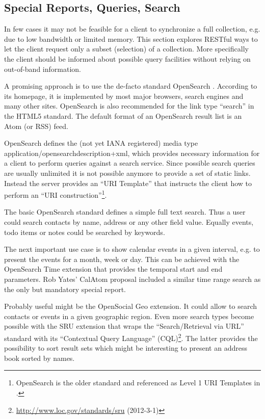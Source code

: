 \documentclass[11pt,a4paper,headsepline,twoside]{scrartcl}		%
\newcommand{\citeurl}[2]{\url{#1} (#2)}
\begin{document}
\subsection{Special Reports, Queries, Search}
\label{sec:spec-reports-search}

In few cases it may not be feasible for a client to synchronize a full
collection, e.g. due to low bandwidth or limited memory. This section explores
RESTful ways to let the client request only a subset (selection) of a
collection. More specifically the client should be informed about possible query
facilities without relying on out-of-band information.

A promising approach is to use the de-facto standard
OpenSearch \cite{Clinton}. According to its homepage, it is implemented by most
major browsers, search engines and many other sites. OpenSearch is also
recommended for the link type ``search'' in the HTML5
standard\cite[sec. 4.12.4.12]{Hickson2011a}. The default format of an OpenSearch
result list is an Atom (or RSS) feed.

OpenSearch defines the (not yet IANA registered) media type
application/opensearchdescription+xml, which provides necessary information for
a client to perform queries against a search service. Since possible search
queries are usually unlimited it is not possible anymore to provide a set of
static links. Instead the server provides an ``URI Template'' \cite{RFC6570}
that instructs the client how to perform an ``URI
construction''\footnote{OpenSearch is the older standard and referenced as Level
  1 URI Templates in \cite{RFC6570}.}.

The basic OpenSearch standard defines a simple full text search. Thus a user
could search contacts by name, address or any other field value. Equally events,
todo items or notes could be searched by keywords.

The next important use case is to show calendar events in a given interval,
e.g. to present the events for a month, week or day. This can be achieved with
the OpenSearch Time extension that provides the temporal start and end
parameters. Rob Yates' CalAtom \cite{draft-yates-atompub-calatom-00.txt} proposal
included a similar time range search as the only but mandatory special report.

Probably useful might be the OpenSocial Geo extension. It could allow to search
contacts or events in a given geographic region. Even more search types become
possible with the SRU extension that wraps the ``Search/Retrieval via URL''
standard with its ``Contextual Query Language''
(CQL)\footnote{\citeurl{http://www.loc.gov/standards/sru}{2012-3-1}}. The latter
provides the possibility to sort result sets which might be interesting to
present an address book sorted by names.
\end{document}
